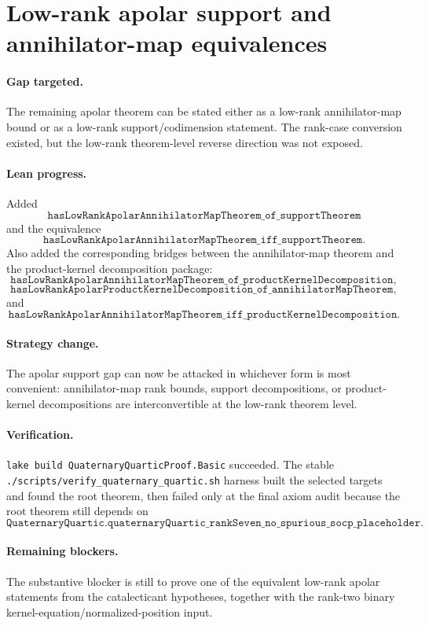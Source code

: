 \documentclass[11pt]{article}
\begin{document}
\section*{Low-rank apolar support and annihilator-map equivalences}

\paragraph{Gap targeted.}
The remaining apolar theorem can be stated either as a low-rank
annihilator-map bound or as a low-rank support/codimension statement.  The
rank-case conversion existed, but the low-rank theorem-level reverse direction
was not exposed.

\paragraph{Lean progress.}
Added
\[
\texttt{hasLowRankApolarAnnihilatorMapTheorem\_of\_supportTheorem}
\]
and the equivalence
\[
\texttt{hasLowRankApolarAnnihilatorMapTheorem\_iff\_supportTheorem}.
\]
Also added the corresponding bridges between the annihilator-map theorem and
the product-kernel decomposition package:
\[
\texttt{hasLowRankApolarAnnihilatorMapTheorem\_of\_productKernelDecomposition},
\]
\[
\texttt{hasLowRankApolarProductKernelDecomposition\_of\_annihilatorMapTheorem},
\]
and
\[
\texttt{hasLowRankApolarAnnihilatorMapTheorem\_iff\_productKernelDecomposition}.
\]

\paragraph{Strategy change.}
The apolar support gap can now be attacked in whichever form is most convenient:
annihilator-map rank bounds, support decompositions, or product-kernel
decompositions are interconvertible at the low-rank theorem level.

\paragraph{Verification.}
\texttt{lake build QuaternaryQuarticProof.Basic} succeeded.  The stable
\texttt{./scripts/verify\_quaternary\_quartic.sh} harness built the selected
targets and found the root theorem, then failed only at the final axiom audit
because the root theorem still depends on
\[
\texttt{QuaternaryQuartic.quaternaryQuartic\_rankSeven\_no\_spurious\_socp\_placeholder}.
\]

\paragraph{Remaining blockers.}
The substantive blocker is still to prove one of the equivalent low-rank
apolar statements from the catalecticant hypotheses, together with the rank-two
binary kernel-equation/normalized-position input.
\end{document}

